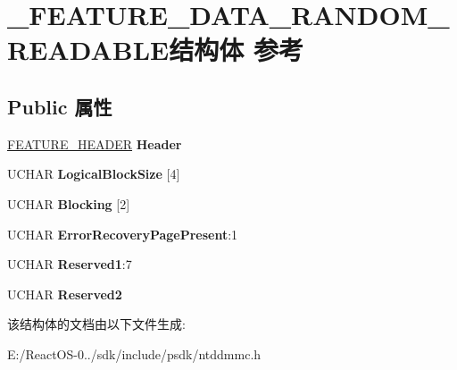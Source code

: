 \hypertarget{struct___f_e_a_t_u_r_e___d_a_t_a___r_a_n_d_o_m___r_e_a_d_a_b_l_e}{}\section{\+\_\+\+F\+E\+A\+T\+U\+R\+E\+\_\+\+D\+A\+T\+A\+\_\+\+R\+A\+N\+D\+O\+M\+\_\+\+R\+E\+A\+D\+A\+B\+L\+E结构体 参考}
\label{struct___f_e_a_t_u_r_e___d_a_t_a___r_a_n_d_o_m___r_e_a_d_a_b_l_e}
\subsection*{Public 属性}
\begin{DoxyCompactItemize}
\item 
\mbox{\label{struct___f_e_a_t_u_r_e___d_a_t_a___r_a_n_d_o_m___r_e_a_d_a_b_l_e_aae2ce2ecdfc3e90013ed42a03d38b648}} 
\hyperlink{struct___f_e_a_t_u_r_e___h_e_a_d_e_r}{F\+E\+A\+T\+U\+R\+E\+\_\+\+H\+E\+A\+D\+ER} {\bfseries Header}
\item 
\mbox{\label{struct___f_e_a_t_u_r_e___d_a_t_a___r_a_n_d_o_m___r_e_a_d_a_b_l_e_a65313d0f9e3d04d6809ff18c956e019c}} 
U\+C\+H\+AR {\bfseries Logical\+Block\+Size} \mbox{[}4\mbox{]}
\item 
\mbox{\label{struct___f_e_a_t_u_r_e___d_a_t_a___r_a_n_d_o_m___r_e_a_d_a_b_l_e_a083ee2dd5ef845d2623e656393f798fc}} 
U\+C\+H\+AR {\bfseries Blocking} \mbox{[}2\mbox{]}
\item 
\mbox{\label{struct___f_e_a_t_u_r_e___d_a_t_a___r_a_n_d_o_m___r_e_a_d_a_b_l_e_a27391a3197c3b46f96568f4799a57249}} 
U\+C\+H\+AR {\bfseries Error\+Recovery\+Page\+Present}\+:1
\item 
\mbox{\label{struct___f_e_a_t_u_r_e___d_a_t_a___r_a_n_d_o_m___r_e_a_d_a_b_l_e_a4cbcea8c7ee6da6d519f3f01d2c5a4f4}} 
U\+C\+H\+AR {\bfseries Reserved1}\+:7
\item 
\mbox{\label{struct___f_e_a_t_u_r_e___d_a_t_a___r_a_n_d_o_m___r_e_a_d_a_b_l_e_a95afb63887d2ff257de73af09a32811f}} 
U\+C\+H\+AR {\bfseries Reserved2}
\end{DoxyCompactItemize}


该结构体的文档由以下文件生成\+:\begin{DoxyCompactItemize}
\item 
E\+:/\+React\+O\+S-\/0../sdk/include/psdk/ntddmmc.\+h\end{DoxyCompactItemize}
